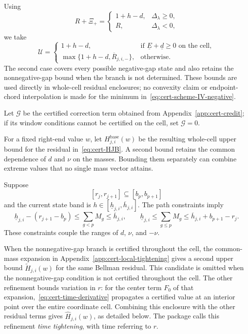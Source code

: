 \documentclass[11pt]{article}
\theoremstyle{definition}
\theoremstyle{remark}
\begin{document}
Using
\[
 R+\Xi_+=
 \begin{cases}
  1+h-d,&\Delta_\lambda\ge0,\\
  R,&\Delta_\lambda<0,
 \end{cases}
\]
we take
\begin{equation}\label{eq:cert-scheme-IV-envelope}
 \mathcal U=
 \begin{cases}
  1+h-d,
     &\text{if $\underline E+\underline d\ge0$ on the cell},\\[1mm]
  \max\{1+h-d,\overline R_{j,i,-}\},
     &\text{otherwise}.
 \end{cases}
\end{equation}
The second case covers every possible negative-gap state and also
retains the nonnegative-gap bound when the branch is not determined.
These bounds are used directly in whole-cell residual enclosures;
no convexity claim or endpoint-chord interpolation is made for the
minimum in~\eqref{eq:cert-scheme-IV-negative}.

Let $\mathcal G$ be the certified correction term obtained from
Appendix~\ref{app:cert-credit}; if its window conditions cannot be
certified on the cell, set $\mathcal G=0$.

For a fixed right-end value $w$, let $H_{j,i}^{\mathrm{base}}(w)$
be the resulting whole-cell upper bound for the residual
in~\eqref{eq:cert-HJB}.
A second bound retains the common dependence
of $d$ and $\nu$ on the masses.  Bounding them separately can combine
extreme values that no single mass vector attains.

Suppose
\[
 [r_j,r_{j+1}]\subseteq[b_p,b_{p+1}]
\]
and the current state band is
$h\in[\underline h_{j,i},\overline h_{j,i}]$.
The path constraints imply
\begin{equation}\label{eq:cert-scheme-V-mass}
 \underline h_{j,i}-(r_{j+1}-b_p)
 \le\sum_{g<p}M_g
 \le\overline h_{j,i},
 \qquad
 \underline h_{j,i}
 \le\sum_{g\le p}M_g
 \le\overline h_{j,i}+b_{p+1}-r_j.
\end{equation}
These constraints couple the ranges of $d$, $\nu$, and $-\nu$.

When the nonnegative-gap branch is certified throughout the cell,
the common-mass expansion in
Appendix~\ref{app:cert-local-tightening} gives a second upper bound
$\widetilde H_{j,i}(w)$ for the same Bellman residual.
This candidate is omitted when the nonnegative-gap condition is not
certified throughout the cell.
The other refinement bounds variation in $r$: for the center term $F_0$
of that expansion,~\eqref{eq:cert-time-derivative} propagates a certified
value at an interior point over the entire coordinate cell.
Combining this enclosure with the other residual terms gives
$\widehat H_{j,i}(w)$, as detailed below.  The package calls this refinement
\emph{time tightening}, with time referring to $r$.
\end{document}
